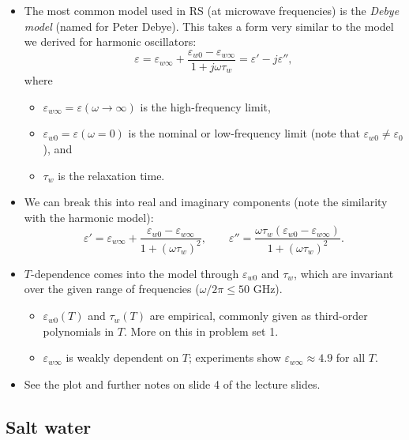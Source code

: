 \documentclass[11pt, oneside]{article}
\begin{document}
\begin{itemize}
	\item The most common model used in RS (at microwave frequencies) is the \emph{Debye model} (named for Peter Debye). This takes a form very similar to the model we derived for harmonic oscillators:
	\begin{equation}
		\varepsilon = \varepsilon_{w\infty} + \frac{\varepsilon_{w0} - \varepsilon_{w\infty}}{1 + j\omega\tau_w} = \varepsilon' - j\varepsilon'',
	\end{equation}
	where
	\begin{itemize}
		\item $\varepsilon_{w\infty} = \varepsilon(\omega\to\infty)$ is the high-frequency limit,
		\item $\varepsilon_{w0} = \varepsilon(\omega = 0)$ is the nominal or low-frequency limit (note that $\varepsilon_{w0} \ne \varepsilon_0$), and
		\item $\tau_w$ is the relaxation time.
	\end{itemize}
	\item We can break this into real and imaginary components (note the similarity with the harmonic model):
	\begin{equation}
		\varepsilon' = \varepsilon_{w\infty} + \frac{\varepsilon_{w0} - \varepsilon_{w\infty}}{1 + (\omega\tau_w)^2},
		\qquad
		\varepsilon'' = \frac{\omega\tau_w(\varepsilon_{w0} - \varepsilon_{w\infty})}{1 + (\omega\tau_w)^2}.
	\end{equation}
	\item $T$-dependence comes into the model through $\varepsilon_{w0}$ and $\tau_w$, which are invariant over the given range of frequencies ($\omega/2\pi \le 50$ GHz).
	\begin{itemize}
		\item $\varepsilon_{w0}(T)$ and $\tau_w(T)$ are empirical, commonly given as third-order polynomials in $T$. More on this in problem set 1.
		\item $\varepsilon_{w\infty}$ is weakly dependent on $T$; experiments show $\varepsilon_{w\infty} \approx 4.9$ for all $T$.
	\end{itemize}
	\item See the plot and further notes on slide 4 of the lecture slides.
\end{itemize}

\subsection{Salt water}
\end{document}
